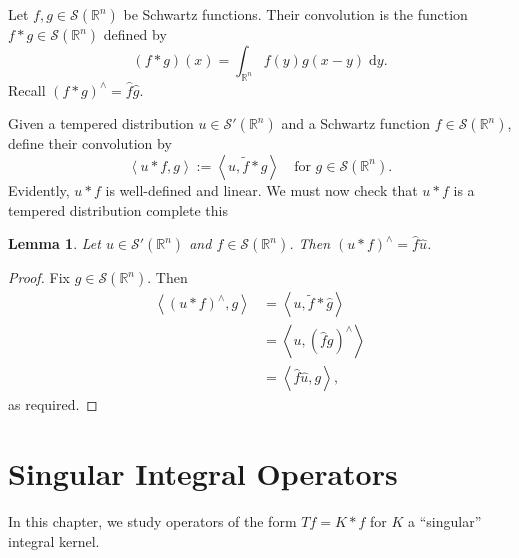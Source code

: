 \documentclass{book}
\newcommand{\scrS}{\mathscr{S}}
\newcommand{\bbR}{\mathbb{R}}
\renewcommand{\d}{\mathrm{d}}
\newcommand{\angles}[1]{\left\langle {#1} \right\rangle}
\newtheorem{lemma}[theorem]{Lemma}
\theoremstyle{definition}
\theoremstyle{remark}
\numberwithin{equation}{chapter}
\begin{document}
Let $f,g \in \scrS(\bbR^n)$ be Schwartz functions. Their convolution is the function $f \ast g \in \scrS(\bbR^n)$ defined by 
\begin{equation}
    (f \ast g)(x) = \int_{\bbR^n} f(y)g(x-y) \; \d y.
\end{equation}
Recall $(f \ast g)^\wedge = \widehat{f}\widehat{g}$.

Given a tempered distribution $u \in \scrS'(\bbR^n)$ and a Schwartz function $f \in \scrS(\bbR^n)$, define their convolution by 
\begin{equation}
    \angles{ u \ast f, g } := \angles{ u, \widetilde{f} \ast g } \quad \text{for } g \in \scrS(\bbR^n).
\end{equation}
Evidently, $u \ast f$ is well-defined and linear. We must now check that $u \ast f$ is a tempered distribution {\color{red} complete this}

\begin{lemma}
    Let $u \in \scrS'(\bbR^n)$ and $f \in \scrS(\bbR^n)$. Then $(u \ast f)^\wedge = \widehat{f}\widehat{u}$.
\end{lemma}
\begin{proof}
    Fix $g \in \scrS(\bbR^n)$. Then 
    \begin{equation} \begin{aligned}
        \angles{(u \ast f)^\wedge, g} &= \angles{ u, \widetilde{f} \ast \widehat{g} } \\
                                      &= \angles{ u, (\widehat{f}g)^\wedge } \\
                                      &= \angles{ \widehat{f} \widehat{u}, g },
    \end{aligned} \end{equation}
    as required.
\end{proof}





\chapter{Singular Integral Operators}
In this chapter, we study operators of the form $Tf = K \ast f$ for $K$ a ``singular'' integral kernel.
\end{document}
